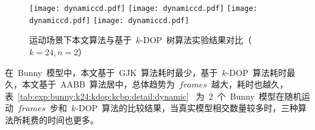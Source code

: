 \begin{figure}[!ht] 
\centering
{}
{  
   \texttt{[image: dynamiccd.pdf]}
}
{  
   \texttt{[image: dynamiccd.pdf]}
}\linebreak %
{  
  \texttt{[image: dynamiccd.pdf]}
}
{  
   \texttt{[image: dynamiccd.pdf]}
}
\caption{运动场景下本文算法与基于~$k$-DOP~树算法实验结果对比（$k=24,n=2$）}
\label{fig:chart:exps:kdop:kcbp:k24:dynamic}
\end{figure}

在~Bunny~模型中，本文基于~GJK~算法耗时最少，基于~$k$-DOP~算法耗时最久，本文基于~AABB~算法居中，总体趋势为~$frames$~越大，耗时也越久，表~\ref{tab:exp:bunny:k24:kdop:kcbp:detail:dynamic}~
为~2~个~Bunny~模型在随机运动~$frames$~步和~$k$-DOP~算法的比较结果，当真实模型相交数量较多时，三种算法所耗费的时间也更多。

